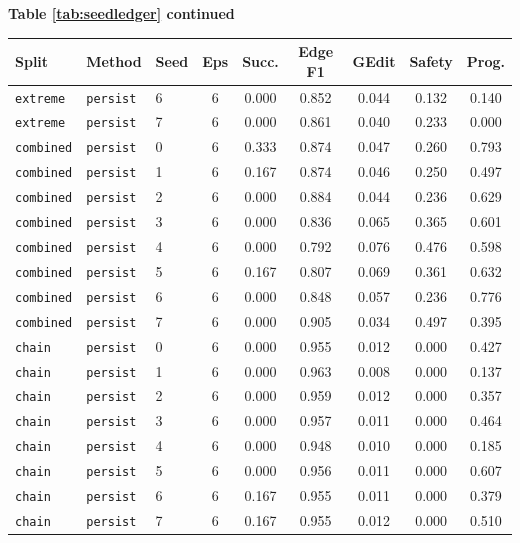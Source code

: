 \documentclass{article}
\begin{document}
\begin{center}
\textbf{Table \ref{tab:seedledger} continued}\\[0.4ex]
\begin{tabular}{lllcccccc}
\toprule
Split & Method & Seed & Eps & Succ. & Edge F1 & GEdit & Safety & Prog. \\
\midrule
\texttt{extreme} & \texttt{persist} & 6 & 6 & 0.000 & 0.852 & 0.044 & 0.132 & 0.140 \\
\texttt{extreme} & \texttt{persist} & 7 & 6 & 0.000 & 0.861 & 0.040 & 0.233 & 0.000 \\
\texttt{combined} & \texttt{persist} & 0 & 6 & 0.333 & 0.874 & 0.047 & 0.260 & 0.793 \\
\texttt{combined} & \texttt{persist} & 1 & 6 & 0.167 & 0.874 & 0.046 & 0.250 & 0.497 \\
\texttt{combined} & \texttt{persist} & 2 & 6 & 0.000 & 0.884 & 0.044 & 0.236 & 0.629 \\
\texttt{combined} & \texttt{persist} & 3 & 6 & 0.000 & 0.836 & 0.065 & 0.365 & 0.601 \\
\texttt{combined} & \texttt{persist} & 4 & 6 & 0.000 & 0.792 & 0.076 & 0.476 & 0.598 \\
\texttt{combined} & \texttt{persist} & 5 & 6 & 0.167 & 0.807 & 0.069 & 0.361 & 0.632 \\
\texttt{combined} & \texttt{persist} & 6 & 6 & 0.000 & 0.848 & 0.057 & 0.236 & 0.776 \\
\texttt{combined} & \texttt{persist} & 7 & 6 & 0.000 & 0.905 & 0.034 & 0.497 & 0.395 \\
\texttt{chain} & \texttt{persist} & 0 & 6 & 0.000 & 0.955 & 0.012 & 0.000 & 0.427 \\
\texttt{chain} & \texttt{persist} & 1 & 6 & 0.000 & 0.963 & 0.008 & 0.000 & 0.137 \\
\texttt{chain} & \texttt{persist} & 2 & 6 & 0.000 & 0.959 & 0.012 & 0.000 & 0.357 \\
\texttt{chain} & \texttt{persist} & 3 & 6 & 0.000 & 0.957 & 0.011 & 0.000 & 0.464 \\
\texttt{chain} & \texttt{persist} & 4 & 6 & 0.000 & 0.948 & 0.010 & 0.000 & 0.185 \\
\texttt{chain} & \texttt{persist} & 5 & 6 & 0.000 & 0.956 & 0.011 & 0.000 & 0.607 \\
\texttt{chain} & \texttt{persist} & 6 & 6 & 0.167 & 0.955 & 0.011 & 0.000 & 0.379 \\
\texttt{chain} & \texttt{persist} & 7 & 6 & 0.167 & 0.955 & 0.012 & 0.000 & 0.510 \\

\end{tabular}
\end{center}
\end{document}
